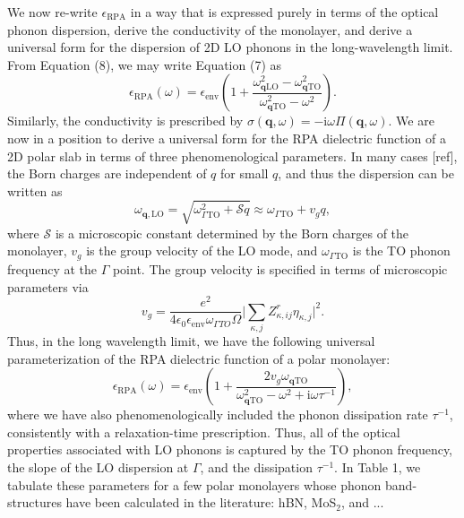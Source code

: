 \documentclass[aps,prb,twocolumn,
	groupedaddress,superscriptaddress,
	amsfonts,amssymb,amsmath,floatfix,
	citeautoscript]{revtex4-1}
\newcommand{\iu}{\mathrm{i}}
\begin{document}
We now re-write $\epsilon_{\mathrm{RPA}}$ in a way that is expressed purely in terms of the optical phonon dispersion, derive the conductivity of the monolayer, and derive a universal form for the dispersion of 2D LO phonons in the long-wavelength limit. From Equation (8), we may write Equation (7) as
\begin{equation}
\epsilon_{\mathrm{RPA}}(\omega) = \epsilon_{\mathrm{env}}\left( 1 + \frac{\omega^2_{\mathbf{q}\mathrm{LO}}-\omega^2_{\mathbf{q}\mathrm{TO}}}{\omega^2_{\mathbf{q}\mathrm{TO}}-\omega^2}\right).
\end{equation}
Similarly, the conductivity is prescribed by $\sigma(\mathbf{q},\omega) = -\iu \omega \Pi(\mathbf{q},\omega)$. We are now in a position to derive a universal form for the RPA dielectric function of a 2D polar slab in terms of three phenomenological parameters. In many cases [ref], the Born charges are independent of $q$ for small $q$, and thus the dispersion can be written as
\begin{equation}
\omega_{\mathbf{q},\mathrm{LO}} = \sqrt{\omega^2_{\Gamma \mathrm{TO}}+\mathcal{S}q} \approx \omega_{\Gamma \mathrm{TO}} + v_g q,
\end{equation}
where $\mathcal{S}$ is a microscopic constant determined by the Born charges of the monolayer, $v_g$ is the group velocity of the LO mode, and $\omega_{\Gamma \mathrm{TO}}$ is the TO phonon frequency at the $\Gamma$ point. The group velocity is specified in terms of microscopic parameters via 
\begin{equation}
v_g = \frac{e^2 }{4\epsilon_0 \epsilon_{\mathrm{env}}\omega_{\Gamma TO}\Omega}\Big|\sum\limits_{\kappa,j}Z^r_{\kappa,ij}\eta_{\kappa,j}  \Big|^2. 
\end{equation}
Thus, in the long wavelength limit, we have the following universal parameterization of the RPA dielectric function of a polar monolayer:
\begin{equation}
\epsilon_{\mathrm{RPA}}(\omega) = \epsilon_{\mathrm{env}}\left( 1 + \frac{2v_g\omega_{\mathbf{q}\mathrm{TO}}}{\omega^2_{\mathbf{q}\mathrm{TO}}-\omega^2+\iu \omega \tau^{-1}}\right),
\end{equation}
where we have also phenomenologically included the phonon dissipation rate $\tau^{-1}$, consistently with  a relaxation-time prescription. Thus, all of the optical properties associated with LO phonons is captured by the TO phonon frequency, the slope of the LO dispersion at $\Gamma$, and the dissipation $\tau^{-1}$. In Table 1, we tabulate these parameters for a few polar monolayers whose phonon band-structures have been calculated in the literature: hBN, MoS$_2$, and ...
\end{document}
